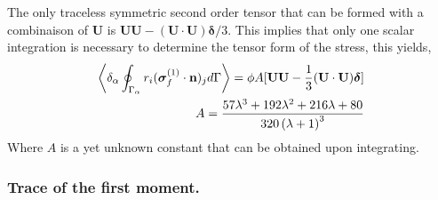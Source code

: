 The only traceless symmetric second order tensor that can be formed with a combinaison of $\textbf{U}$ is $\textbf{UU} - (\textbf{U}\cdot \textbf{U})\bm\delta /3$. 
This implies that only one scalar integration is necessary to determine the tensor form of the  stress, this yields,
\begin{align*}
    \left<\delta_\alpha \oint_{\Gamma_{\alpha}} r_i (\bm\sigma_f^{(1)} \cdot \textbf{n})_j d\Gamma\right>
    = 
    \phi A
    [
        \textbf{UU} - \frac{1}{3}(\textbf{U}\cdot \textbf{U})\bm\delta 
    ]\\
    A=  \frac{57 \lambda^{3} + 192 \lambda^{2} + 216 \lambda + 80}{320 \left(\lambda + 1\right)^{3}}
\end{align*}
Where $A$ is a yet unknown constant that can be obtained upon integrating. 


\subsubsection{Trace of the first moment.}

